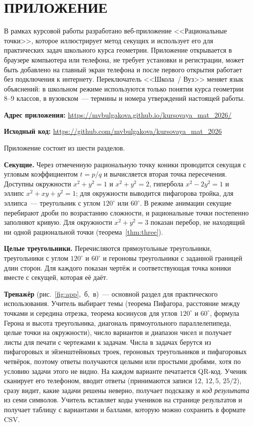 \documentclass[a4paper,14pt]{extreport}
\theoremstyle{definition}
\begin{document}
\chapter*{ПРИЛОЖЕНИЕ}
\setcounter{figure}{0}
\renewcommand{\thefigure}{П.\arabic{figure}}

В рамках курсовой работы разработано веб-приложение <<Рациональные точки>>,
которое иллюстрирует метод секущих и использует его для практических задач
школьного курса геометрии. Приложение открывается в браузере компьютера или
телефона, не требует установки и регистрации, может быть добавлено на главный
экран телефона и после первого открытия работает без подключения к интернету.
Переключатель <<Школа~/ Вуз>> меняет язык объяснений: в школьном режиме
используются только понятия курса геометрии 8--9 классов, в вузовском~--- термины
и номера утверждений настоящей работы.

\textbf{Адрес приложения:} \url{https://mvbulgakova.github.io/kursovaya_mat_2026/}

\textbf{Исходный код:} \url{https://github.com/mvbulgakova/kursovaya_mat_2026}

Приложение состоит из шести разделов.

\textbf{Секущие.} Через отмеченную рациональную точку коники проводится секущая
с угловым коэффициентом $t=p/q$ и вычисляется вторая точка пересечения.
Доступны окружности $x^2+y^2=1$ и $x^2+y^2=2$, гипербола $x^2-2y^2=1$ и эллипс
$x^2+xy+y^2=1$; для окружности выводится пифагорова тройка, для эллипса~---
треугольник с углом $120^\circ$ или $60^\circ$. В режиме анимации секущие
перебирают дроби по возрастанию сложности, и рациональные точки постепенно
заполняют кривую. Для окружности $x^2+y^2=3$ показан перебор, не находящий ни
одной рациональной точки (теорема~\ref{thm:three}).

\textbf{Целые треугольники.} Перечисляются прямоугольные треугольники, треугольники с
углом $120^\circ$ и $60^\circ$ и героновы треугольники с заданной границей
длин сторон. Для каждого показан чертёж и соответствующая точка коники вместе с
секущей, которая её даёт.

\textbf{Тренажёр} (рис.~\ref{fig:app},~б,~в)~--- основной раздел для практического
использования. Учитель выбирает темы (теорема Пифагора, расстояние между точками
и середина отрезка, теорема косинусов для углов $120^\circ$ и $60^\circ$,
формула Герона и высота треугольника, диагональ прямоугольного
параллелепипеда, целые точки на окружности), число вариантов и диапазон чисел и
получает листы для печати с чертежами к задачам. Числа в задачах берутся из
пифагоровых и эйзенштейновых троек, героновых треугольников и пифагоровых
четвёрок, поэтому ответы получаются целыми или простыми дробями, хотя по
условию задачи этого не видно. На каждом варианте печатается QR-код. Ученик
сканирует его телефоном, вводит ответы (принимаются записи $12$, $12{,}5$,
$25/2$), сразу видит, какие задачи решены неверно, получает подсказку и
\emph{код результата} из семи символов. Учитель вставляет коды учеников на
странице результатов и получает таблицу с вариантами и баллами, которую можно
сохранить в формате CSV.
\end{document}

